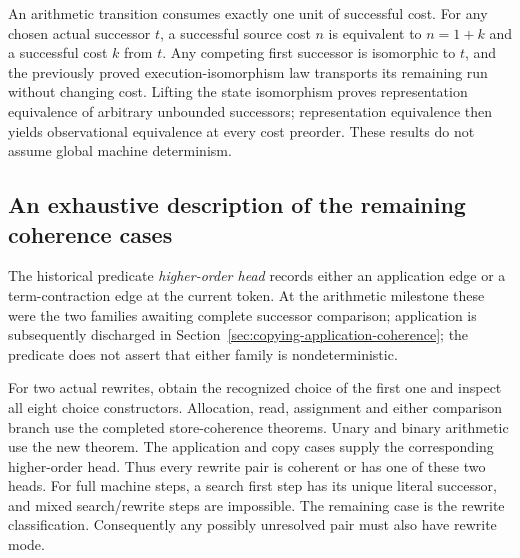 

An arithmetic transition consumes exactly one unit of successful cost.
For any chosen actual successor $t$, a successful source cost $n$ is equivalent
to $n=1+k$ and a successful cost $k$ from $t$. Any competing first successor
is isomorphic to $t$, and the previously proved execution-isomorphism law
transports its remaining run without changing cost. Lifting the state
isomorphism proves representation equivalence of arbitrary unbounded
successors; representation equivalence then yields observational equivalence
at every cost preorder. These results do not assume global machine determinism.




\subsection{An exhaustive description of the remaining coherence cases}

The historical predicate \emph{higher-order head} records either an application edge or
a term-contraction edge at the current token. At the arithmetic milestone these were
the two families awaiting complete successor comparison; application is
subsequently discharged in Section~\ref{sec:copying-application-coherence};
the predicate does not assert that either family is nondeterministic.


For two actual rewrites, obtain the recognized choice of the first one
and inspect all eight choice constructors. Allocation, read, assignment and
either comparison branch use the completed store-coherence theorems. Unary and
binary arithmetic use the new theorem. The application and copy cases supply
the corresponding higher-order head. Thus every rewrite pair is coherent or
has one of these two heads. For full machine steps, a search first step has
its unique literal successor, and mixed search/rewrite steps are impossible.
The remaining case is the rewrite classification. Consequently any possibly
unresolved pair must also have rewrite mode.

